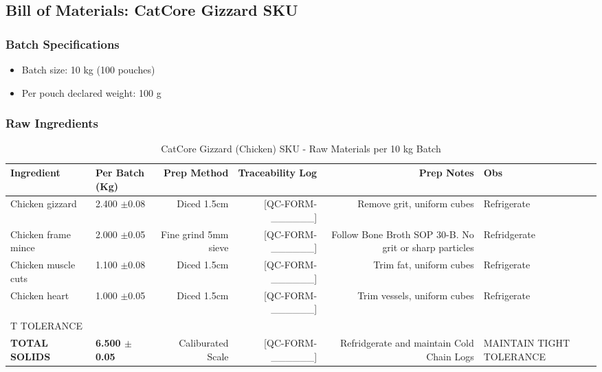 \subsection*{Bill of Materials: CatCore Gizzard SKU}
\label{bom:catcore_heart}

\subsubsection*{Batch Specifications}
\begin{itemize}
\item Batch size: 10 kg (100 pouches)
\item Per pouch declared weight: 100 g
\end{itemize}

\subsubsection*{Raw Ingredients}
\begin{table}[h]
\centering
\caption{CatCore Gizzard (Chicken) SKU - Raw Materials per 10 kg Batch}
\begin{tabular}{@{}llrrrp{4cm}@{}}
\toprule
\textbf{Ingredient} & \textbf{Per Batch (Kg)} & \textbf{Prep Method}  & \textbf{Traceability Log} & \textbf{Prep Notes} & \textbf{Obs}\\
\midrule
Chicken gizzard     & 2.400 $\pm$0.08  & Diced 1.5cm            & [QC-FORM-\_\_\_\_\_\_] & Remove grit, uniform cubes & Refrigerate\\
Chicken frame mince & 2.000 $\pm$0.05  & Fine grind 5mm sieve   & [QC-FORM-\_\_\_\_\_\_] & Follow Bone Broth SOP 30-B. No grit or sharp particles & Refridgerate  \\
Chicken muscle cuts & 1.100 $\pm$0.08  & Diced 1.5cm            & [QC-FORM-\_\_\_\_\_\_] & Trim fat, uniform cubes & Refrigerate\\
Chicken heart       & 1.000 $\pm$0.05  & Diced 1.5cm            & [QC-FORM-\_\_\_\_\_\_] & Trim vessels, uniform cubes & Refrigerate\\T TOLERANCE \\ 
\midrule
\textbf{TOTAL SOLIDS} & \textbf{6.500 $\pm$0.05} & Caliburated Scale & [QC-FORM-\_\_\_\_\_\_] & Refridgerate and maintain Cold Chain Logs & MAINTAIN TIGHT TOLERANCE \\
\bottomrule
\end{tabular}
\end{table}


